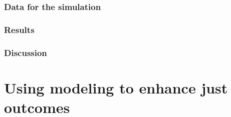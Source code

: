 \subsection{Data for the simulation}

\subsection{Results}

\subsection{Discussion}








\chapter{Using modeling to enhance just outcomes}
\label{chapter:communities}



